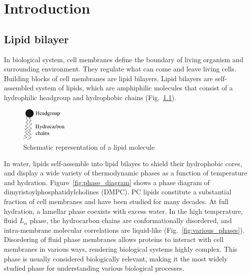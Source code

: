 \chapter{Introduction}
\section{Lipid bilayer}
In biological system, cell membranes define the boundary of living organism
and surrounding environment. They regulate what can come and leave living
cells. Building blocks of cell membranes are lipid bilayers.
Lipid bilayers are self-assembled system of lipids, which are 
amphiphilic molecules that consist of a hydrophilic headgroup
and hydrophobic chains (Fig.~\ref{fig:lipid}).

\begin{figure}
  \centering
  \includegraphics[width=0.2\textwidth]{figures/lipid}
  \caption{Schematic representation of a lipid molecule}
  \label{fig:lipid}
\end{figure}

In water, lipids self-assemble into lipid bilayes to shield their hydrophobic 
cores, and 
display a wide variety of thermodynamic phases
as a function of temperature and hydration. Figure~\ref{fig:phase_diagram}
shows a phase diagram of dimyristoylphosphatidylcholines (DMPC).
PC lipids constitute a substantial fraction of cell membranes
and have been studied for many decades.
At full hydration, a lamellar phase coexists with excess water.
In the high temperature, fluid $L_\alpha$ phase, the hydrocarbon chains 
are conformationally disordered, and intra-membrane molecular correlations 
are liquid-like \cite{ref:Fahey78} (Fig.~\ref{fig:various_phases}).
Disordering of fluid phase membranes allows proteins to 
interact with cell membranes in various ways, rendering biological systems
highly complex. 
This phase is usually considered biologically relevant, making it
the most widely studied phase for understanding various biological processes.

